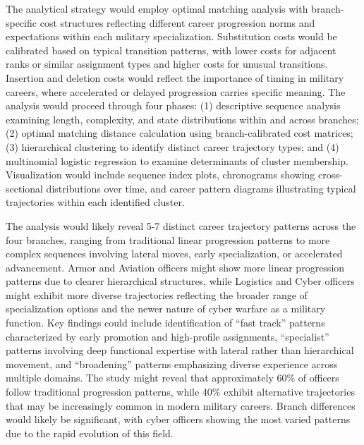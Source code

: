 \documentclass[../main.tex]{subfiles}
\begin{document}
The analytical strategy would employ optimal matching analysis with branch-specific cost structures reflecting different career progression norms and expectations within each military specialization. Substitution costs would be calibrated based on typical transition patterns, with lower costs for adjacent ranks or similar assignment types and higher costs for unusual transitions. Insertion and deletion costs would reflect the importance of timing in military careers, where accelerated or delayed progression carries specific meaning. The analysis would proceed through four phases: (1) descriptive sequence analysis examining length, complexity, and state distributions within and across branches; (2) optimal matching distance calculation using branch-calibrated cost matrices; (3) hierarchical clustering to identify distinct career trajectory types; and (4) multinomial logistic regression to examine determinants of cluster membership. Visualization would include sequence index plots, chronograms showing cross-sectional distributions over time, and career pattern diagrams illustrating typical trajectories within each identified cluster.


The analysis would likely reveal 5-7 distinct career trajectory patterns across the four branches, ranging from traditional linear progression patterns to more complex sequences involving lateral moves, early specialization, or accelerated advancement. Armor and Aviation officers might show more linear progression patterns due to clearer hierarchical structures, while Logistics and Cyber officers might exhibit more diverse trajectories reflecting the broader range of specialization options and the newer nature of cyber warfare as a military function. Key findings could include identification of ``fast track'' patterns characterized by early promotion and high-profile assignments, ``specialist'' patterns involving deep functional expertise with lateral rather than hierarchical movement, and ``broadening'' patterns emphasizing diverse experience across multiple domains. The study might reveal that approximately 60\% of officers follow traditional progression patterns, while 40\% exhibit alternative trajectories that may be increasingly common in modern military careers. Branch differences would likely be significant, with cyber officers showing the most varied patterns due to the rapid evolution of this field.

\end{document}
